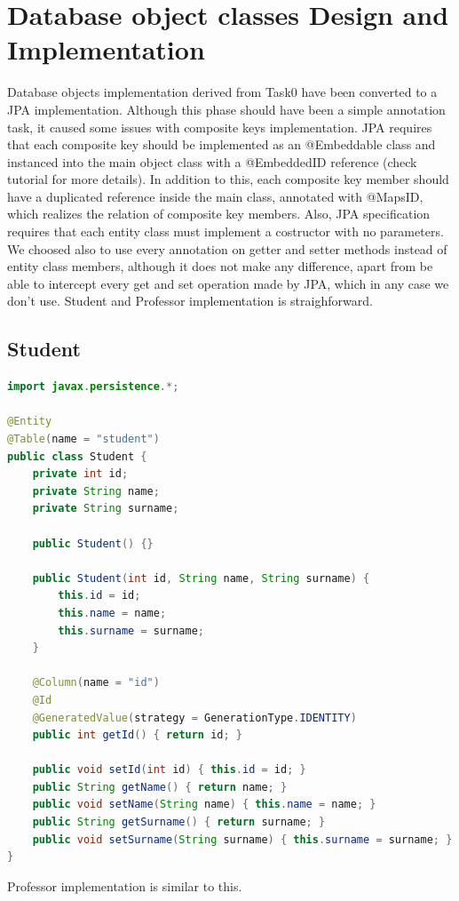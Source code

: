 \documentclass{report}
\begin{document}
\section*{Database object classes Design and Implementation}
Database objects implementation derived from Task0 have been converted to a JPA implementation. Although this phase should have been a simple annotation task, it caused some issues with composite keys implementation. JPA requires that each composite key should be implemented as an @Embeddable class and instanced into the main object class with a @EmbeddedID reference (check tutorial for more details). In addition to this, each composite key member should have a duplicated reference inside the main class, annotated with @MapsID, which realizes the relation of composite key members. Also, JPA specification requires that each entity class must implement a costructor with no parameters. We choosed also to use every annotation on getter and setter methods instead of entity class members, although it does not make any difference, apart from be able to intercept every get and set operation made by JPA, which in any case we don't use. Student and Professor implementation is straighforward.

\subsection*{Student}
\begin{lstlisting}[language=Java]
import javax.persistence.*;

@Entity
@Table(name = "student")
public class Student {
	private int id;
	private String name;
	private String surname;

	public Student() {}

	public Student(int id, String name, String surname) {
		this.id = id;
		this.name = name;
		this.surname = surname;
	}

	@Column(name = "id")
	@Id
	@GeneratedValue(strategy = GenerationType.IDENTITY)
	public int getId() { return id; }

	public void setId(int id) { this.id = id; }
	public String getName() { return name; }
	public void setName(String name) { this.name = name; }
	public String getSurname() { return surname; }
	public void setSurname(String surname) { this.surname = surname; }
}
\end{lstlisting}
Professor implementation is similar to this.
\end{document}
